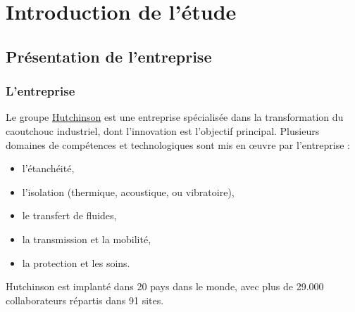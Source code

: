\cleardoublepage



\chapter{Introduction de l'étude}


\section{Présentation de l'entreprise}


\subsection{L'entreprise}

Le groupe \href{http://www.hutchinson.fr}{Hutchinson} est une entreprise spécialisée dans la transformation du caoutchouc industriel, dont l'innovation est l'objectif principal.
Plusieurs domaines de compétences et technologiques sont mis en œuvre par l'entreprise :
\begin{itemize}
	\item l'étanchéité,
	\item l'isolation (thermique, acoustique, ou vibratoire),
	\item le transfert de fluides,
	\item la transmission et la mobilité,
	\item la protection et les soins.
\\
\end{itemize}


Hutchinson est implanté dans 20 pays dans le monde, avec plus de 29.000 collaborateurs répartis dans 91 sites.

